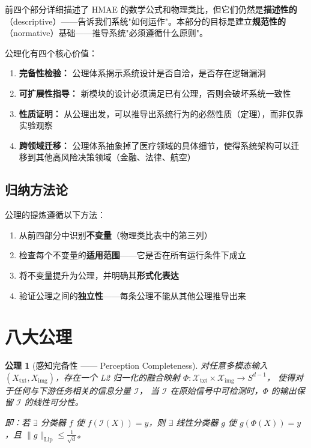 \documentclass[11pt,a4paper]{ctexart}
\newtheorem{axiom}{公理}[section]
\theoremstyle{remark}
\begin{document}
前四个部分详细描述了 HMAE 的数学公式和物理类比，但它们仍然是\textbf{描述性的}
（descriptive）——告诉我们系统"如何运作"。本部分的目标是建立\textbf{规范性的}
（normative）基础——推导系统"必须遵循什么原则"。

公理化有四个核心价值：
\begin{enumerate}[nosep]
\item \textbf{完备性检验：} 公理体系揭示系统设计是否自洽，是否存在逻辑漏洞
\item \textbf{可扩展性指导：} 新模块的设计必须满足已有公理，否则会破坏系统一致性
\item \textbf{性质证明：} 从公理出发，可以推导出系统行为的必然性质（定理），而非仅靠实验观察
\item \textbf{跨领域迁移：} 公理体系抽象掉了医疗领域的具体细节，使得系统架构可以迁移到其他高风险决策领域（金融、法律、航空）
\end{enumerate}

\subsection{归纳方法论}

公理的提炼遵循以下方法：
\begin{enumerate}[nosep]
\item 从前四部分中识别\textbf{不变量}（物理类比表中的第三列）
\item 检查每个不变量的\textbf{适用范围}——它是否在所有运行条件下成立
\item 将不变量提升为公理，并明确其\textbf{形式化表达}
\item 验证公理之间的\textbf{独立性}——每条公理不能从其他公理推导出来
\end{enumerate}

\section{八大公理}

\begin{axiom}[感知完备性 —— Perception Completeness]
\label{ax:perception}
对任意多模态输入 $(X_{\text{txt}}, X_{\text{img}})$，存在一个 L2 归一化的融合映射
$\Phi: \mathcal{X}_{\text{txt}} \times \mathcal{X}_{\text{img}} \to S^{d-1}$，
使得对于任何与下游任务相关的信息分量 $\mathcal{I}$，
当 $\mathcal{I}$ 在原始信号中可检测时，$\Phi$ 的输出保留 $\mathcal{I}$ 的线性可分性。

即：若 $\exists$ 分类器 $f$ 使 $f(\mathcal{I}(X)) = y$，则
$\exists$ 线性分类器 $g$ 使 $g(\Phi(X)) = y$，且 $\|g\|_{\text{Lip}} \leq \frac{1}{\sqrt{d}}$。
\end{axiom}
\end{document}
